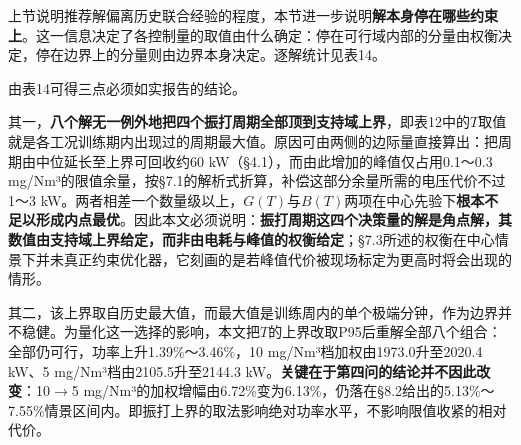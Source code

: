 \documentclass[UTF8,zihao=5,a4paper]{ctexart}
\begin{document}
上节说明推荐解偏离历史联合经验的程度，本节进一步说明\textbf{解本身停在哪些约束上}。这一信息决定了各控制量的取值由什么确定：停在可行域内部的分量由权衡决定，停在边界上的分量则由边界本身决定。逐解统计见表14。


\begin{table}[htb]
\centering
\caption*{\normalsize 表14　最优解的活跃约束与振打周期上界的敏感性}
\vspace{-2pt}
\end{table}

由表14可得三点必须如实报告的结论。

其一，\textbf{八个解无一例外地把四个振打周期全部顶到支持域上界}，即表12中的$T$取值就是各工况训练期内出现过的周期最大值。原因可由两侧的边际量直接算出：把周期由中位延长至上界可回收约60 kW（§4.1），而由此增加的峰值仅占用0.1～0.3 mg/Nm³的限值余量，按§7.1的解析式折算，补偿这部分余量所需的电压代价不过1～3 kW。两者相差一个数量级以上，$G(T)$与$B(T)$两项在中心先验下\textbf{根本不足以形成内点最优}。因此本文必须说明：\textbf{振打周期这四个决策量的解是角点解，其数值由支持域上界给定，而非由电耗与峰值的权衡给定}；§7.3所述的权衡在中心情景下并未真正约束优化器，它刻画的是若峰值代价被现场标定为更高时将会出现的情形。

其二，该上界取自历史最大值，而最大值是训练周内的单个极端分钟，作为边界并不稳健。为量化这一选择的影响，本文把$T$的上界改取P95后重解全部八个组合：全部仍可行，功率上升1.39\%～3.46\%，10 mg/Nm³档加权由1973.0升至2020.4 kW、5 mg/Nm³档由2105.5升至2144.3 kW。\textbf{关键在于第四问的结论并不因此改变}：10$\rightarrow$5 mg/Nm³的加权增幅由6.72\%变为6.13\%，仍落在§8.2给出的5.13\%～7.55\%情景区间内。即振打上界的取法影响绝对功率水平，不影响限值收紧的相对代价。
\end{document}
